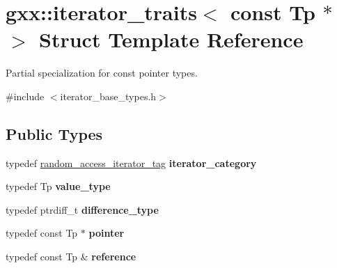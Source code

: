 \hypertarget{structgxx_1_1iterator__traits_3_01const_01Tp_01_5_01_4}{}\section{gxx\+:\+:iterator\+\_\+traits$<$ const Tp $\ast$ $>$ Struct Template Reference}
\label{structgxx_1_1iterator__traits_3_01const_01Tp_01_5_01_4}


Partial specialization for const pointer types.  




{\ttfamily \#include $<$iterator\+\_\+base\+\_\+types.\+h$>$}

\subsection*{Public Types}
\begin{DoxyCompactItemize}
\item 
typedef \hyperlink{structgxx_1_1random__access__iterator__tag}{random\+\_\+access\+\_\+iterator\+\_\+tag} {\bfseries iterator\+\_\+category}\hypertarget{structgxx_1_1iterator__traits_3_01const_01Tp_01_5_01_4_abb09706d991a3b999e722efa5e18cfc9}{}\label{structgxx_1_1iterator__traits_3_01const_01Tp_01_5_01_4_abb09706d991a3b999e722efa5e18cfc9}

\item 
typedef Tp {\bfseries value\+\_\+type}\hypertarget{structgxx_1_1iterator__traits_3_01const_01Tp_01_5_01_4_a9cb70429045d12e4a49c7154d53902b1}{}\label{structgxx_1_1iterator__traits_3_01const_01Tp_01_5_01_4_a9cb70429045d12e4a49c7154d53902b1}

\item 
typedef ptrdiff\+\_\+t {\bfseries difference\+\_\+type}\hypertarget{structgxx_1_1iterator__traits_3_01const_01Tp_01_5_01_4_a87d1a89262070d72e075834b10300d04}{}\label{structgxx_1_1iterator__traits_3_01const_01Tp_01_5_01_4_a87d1a89262070d72e075834b10300d04}

\item 
typedef const Tp $\ast$ {\bfseries pointer}\hypertarget{structgxx_1_1iterator__traits_3_01const_01Tp_01_5_01_4_a676a390feddf93c6debfce40bd8076de}{}\label{structgxx_1_1iterator__traits_3_01const_01Tp_01_5_01_4_a676a390feddf93c6debfce40bd8076de}

\item 
typedef const Tp \& {\bfseries reference}\hypertarget{structgxx_1_1iterator__traits_3_01const_01Tp_01_5_01_4_af6e0e794b8dbfda3e36c0b75be234fb7}{}\label{structgxx_1_1iterator__traits_3_01const_01Tp_01_5_01_4_af6e0e794b8dbfda3e36c0b75be234fb7}

\end{DoxyCompactItemize}


